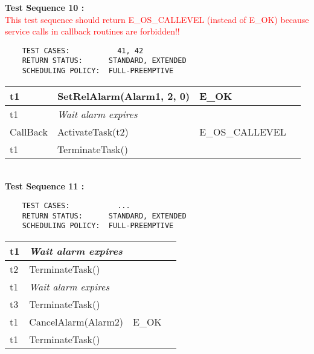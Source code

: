 \documentclass[10pt]{article}
\newlength{\Li}\settowidth{\Li}{Running}
\newlength{\Lii}\setlength{\Lii}{7cm}
\newlength{\Liiii}\setlength{\Liiii}{0.9cm}
\newlength{\Liii}\setlength{\Liii}{\textwidth} \addtolength{\Liii}{-\Li} \addtolength{\Liii}{-\Lii} \addtolength{\Liii}{-\Liiii}
\begin{document}
	\textbf{Test Sequence 10 :}\\
	\textcolor{red}{This test sequence should return E\_OS\_CALLEVEL (instead of E\_OK) because service calls in callback routines are forbidden!!}
	\begin{lstlisting}
	TEST CASES:		      41, 42
	RETURN STATUS:	    STANDARD, EXTENDED
	SCHEDULING POLICY:  FULL-PREEMPTIVE
	\end{lstlisting}
	
	
	\begin{supertabular}{|p{\Li}|p{\Lii}|p{\Liii}|p{\Liiii}|} \hline 
	t1	& SetRelAlarm(Alarm1, 2, 0)				& E\_OK					& \\ \hline
	t1	& \textit{Wait alarm expires}			 	& 						& \\ \hline  
	CallBack	& ActivateTask(t2)					& E\_OS\_CALLEVEL		& \\ \hline
	t1	& TerminateTask()						& 						& \\ \hline 
	\end{supertabular} \\
	
	\textbf{Test Sequence 11 :}\\
	\begin{lstlisting}
	TEST CASES:		      ...
	RETURN STATUS:	    STANDARD, EXTENDED
	SCHEDULING POLICY:  FULL-PREEMPTIVE
	\end{lstlisting}
	
	
	\begin{supertabular}{|p{\Li}|p{\Lii}|p{\Liii}|p{\Liiii}|} \hline 
	t1	& \textit{Wait alarm expires}				&						& \\ \hline
	t2	& TerminateTask()						& 						& \\ \hline 
	t1	& \textit{Wait alarm expires}				&						& \\ \hline
	t3	& TerminateTask()						& 						& \\ \hline 
	t1	& CancelAlarm(Alarm2)					& E\_OK					& \\ \hline
	t1	& TerminateTask()						& 						& \\ \hline 
	\end{supertabular} \\
	
	
\end{document}
